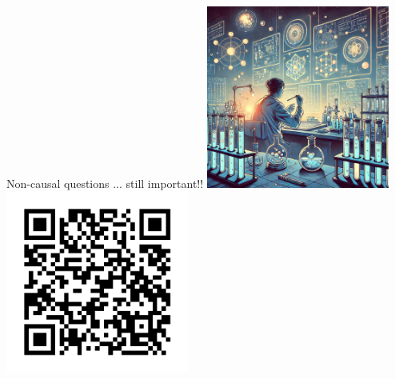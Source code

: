 \documentclass{beamer}
\begin{document}
\begin{frame}{Non-causal questions ... still important!!}
  \includegraphics[width=0.45\textwidth]{scientist}
  \includegraphics[width=0.45\textwidth]{QR0}
\end{frame}
\end{document}
